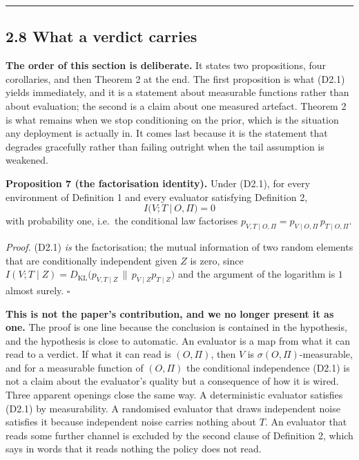 \documentclass[11pt,a4paper]{article}
\begin{document}
\begin{center}\rule{0.5\linewidth}{0.5pt}\end{center}

\subsection{2.8 What a verdict carries}\label{what-a-verdict-carries}

\textbf{The order of this section is deliberate.} It states two propositions, four
corollaries, and then Theorem 2 at the end. The first proposition is what (D2.1)
yields immediately, and it is a statement about measurable functions rather than
about evaluation; the second is a claim about one measured artefact. Theorem 2 is
what remains when we stop conditioning on the prior, which is the situation any
deployment is actually in. It comes last because it is the statement that degrades
gracefully rather than failing outright when the tail assumption is weakened.

\textbf{Proposition 7 (the factorisation identity).} Under (D2.1), for every environment
of Definition 1 and every evaluator satisfying Definition 2,
\begin{equation}
\boxed{\ I\big(V;T\ \big|\ O,\Pi\big)=0\ }
\tag{2.8.1}
\end{equation}
with probability one, i.e.~the conditional law factorises
\(p_{V,T\mid O,\Pi}=p_{V\mid O,\Pi}\,p_{T\mid O,\Pi}\).

\emph{Proof.} (D2.1) \emph{is} the factorisation; the mutual information of two random
elements that are conditionally independent given \(Z\) is zero, since
\(I(V;T\mid Z)=D_{\mathrm{KL}}\big(p_{V,T\mid Z}\,\|\,p_{V\mid Z}p_{T\mid Z}\big)\)
and the argument of the logarithm is \(1\) almost surely. \(\square\)

\textbf{This is not the paper's contribution, and we no longer present it as one.} The
proof is one line because the conclusion is contained in the hypothesis, and the
hypothesis is close to automatic. An evaluator is a map from what it can read to a
verdict. If what it can read is \((O,\Pi)\), then \(V\) is \(\sigma(O,\Pi)\)-measurable,
and for a measurable function of \((O,\Pi)\) the conditional independence (D2.1) is
not a claim about the evaluator's quality but a consequence of how it is wired.
Three apparent openings close the same way. A deterministic evaluator satisfies
(D2.1) by measurability. A randomised evaluator that draws independent noise
satisfies it because independent noise carries nothing about \(T\). An evaluator that
reads some further channel is excluded by the second clause of Definition 2, which
says in words that it reads nothing the policy does not read.
\end{document}
